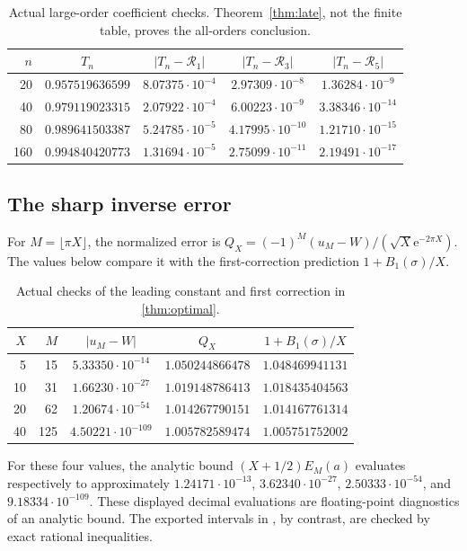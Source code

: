 \documentclass[11pt,a4paper]{article}
\theoremstyle{definition}
\numberwithin{equation}{section}
\newcommand{\ee}{\mathrm{e}}
\begin{document}
\begin{table}[!htb]
\centering\small
\begin{tabular}{rcccc}
\toprule
$n$ & $T_n$ & $|T_n-\mathcal R_1|$ & $|T_n-\mathcal R_3|$ & $|T_n-\mathcal R_5|$\\
\midrule
20  & $0.957519636599$ & $8.07375\cdot10^{-4}$ & $2.97309\cdot10^{-8}$ & $1.36284\cdot10^{-9}$\\
40  & $0.979119023315$ & $2.07922\cdot10^{-4}$ & $6.00223\cdot10^{-9}$ & $3.38346\cdot10^{-14}$\\
80  & $0.989641503387$ & $5.24785\cdot10^{-5}$ & $4.17995\cdot10^{-10}$ & $1.21710\cdot10^{-15}$\\
160 & $0.994840420773$ & $1.31694\cdot10^{-5}$ & $2.75099\cdot10^{-11}$ & $2.19491\cdot10^{-17}$\\
\bottomrule
\end{tabular}
\caption{Actual large-order coefficient checks. Theorem~\ref{thm:late}, not the finite table, proves the all-orders conclusion.}
\label{tab:late}
\end{table}

\subsection{The sharp inverse error}
For $M=\lfloor\pi X\rfloor$, the normalized error is
$Q_X=(-1)^M(u_M-W)/(\sqrt X\ee^{-2\pi X})$. The values below compare it with the first-correction prediction $1+B_1(\sigma)/X$.

\begin{table}[!htb]
\centering\small
\begin{tabular}{rrccc}
\toprule
$X$ & $M$ & $|u_M-W|$ & $Q_X$ & $1+B_1(\sigma)/X$\\
\midrule
5  & 15  & $5.33350\cdot10^{-14}$  & $1.050244866478$ & $1.048469941131$\\
10 & 31  & $1.66230\cdot10^{-27}$  & $1.019148786413$ & $1.018435404563$\\
20 & 62  & $1.20674\cdot10^{-54}$  & $1.014267790151$ & $1.014167761314$\\
40 & 125 & $4.50221\cdot10^{-109}$ & $1.005782589474$ & $1.005751752002$\\
\bottomrule
\end{tabular}
\caption{Actual checks of the leading constant and first correction in \cref{thm:optimal}.}
\label{tab:optimal}
\end{table}

For these four values, the analytic bound $(X+1/2)E_M(a)$ evaluates respectively to approximately
$1.24171\cdot10^{-13}$, $3.62340\cdot10^{-27}$,
$2.50333\cdot10^{-54}$, and $9.18334\cdot10^{-109}$.
These displayed decimal evaluations are floating-point diagnostics of an analytic bound. The exported intervals in , by contrast, are checked by exact rational inequalities.
\end{document}
